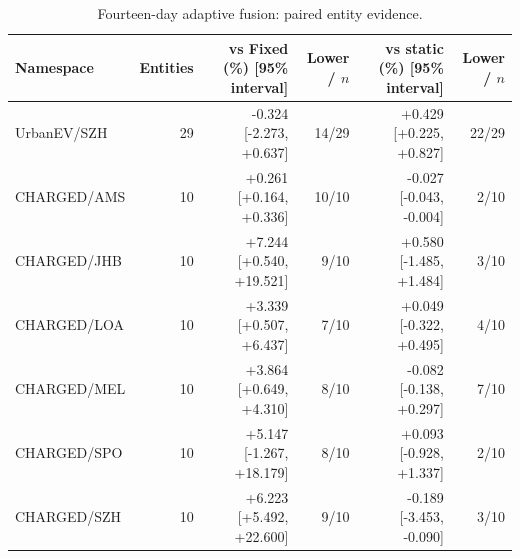 \begin{table}[t]
\centering\footnotesize
\caption{Fourteen-day adaptive fusion: paired entity evidence.}\label{tab:uncertainty}
\begin{tabular*}{\textwidth}{@{\extracolsep{\fill}}lrrrrr@{}}\toprule
Namespace & Entities & vs Fixed (\%) [95\% interval] & Lower / $n$ & vs static (\%) [95\% interval] & Lower / $n$\\\midrule
UrbanEV/SZH & 29 & -0.324 [-2.273, +0.637] & 14/29 & +0.429 [+0.225, +0.827] & 22/29\\
CHARGED/AMS & 10 & +0.261 [+0.164, +0.336] & 10/10 & -0.027 [-0.043, -0.004] & 2/10\\
CHARGED/JHB & 10 & +7.244 [+0.540, +19.521] & 9/10 & +0.580 [-1.485, +1.484] & 3/10\\
CHARGED/LOA & 10 & +3.339 [+0.507, +6.437] & 7/10 & +0.049 [-0.322, +0.495] & 4/10\\
CHARGED/MEL & 10 & +3.864 [+0.649, +4.310] & 8/10 & -0.082 [-0.138, +0.297] & 7/10\\
CHARGED/SPO & 10 & +5.147 [-1.267, +18.179] & 8/10 & +0.093 [-0.928, +1.337] & 2/10\\
CHARGED/SZH & 10 & +6.223 [+5.492, +22.600] & 9/10 & -0.189 [-3.453, -0.090] & 3/10\\
\bottomrule\end{tabular*}\end{table}
